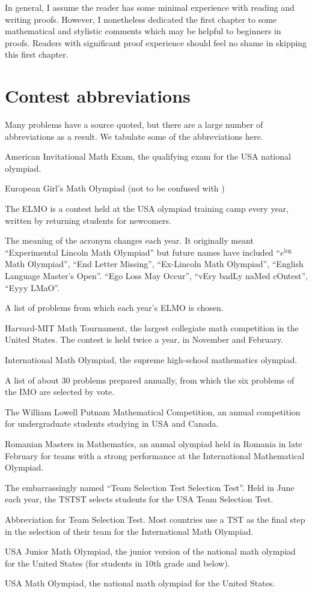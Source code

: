 In general, I assume the reader has some minimal
experience with reading and writing proofs.
However, I nonetheless dedicated the first chapter
to some mathematical and stylistic comments
which may be helpful to beginners in proofs.
Readers with significant proof experience should
feel no shame in skipping this first chapter.

\section*{Contest abbreviations}
Many problems have a source quoted,
but there are a large number of abbreviations as a result.
We tabulate some of the abbreviations here.

\begin{description}
	\ii[AIME] American Invitational Math Exam,
	the qualifying exam for the USA national olympiad.

	\ii[EGMO] European Girl's Math Olympiad
	(not to be confused with \cite{ref:EGMO})

	\ii[ELMO] The ELMO is a contest held at the USA olympiad
	training camp every year,
	written by returning students for newcomers.

	The meaning of the acronym changes each year.
	It originally meant ``Experimental Lincoln Math Olympiad''
	but future names have included ``$e^{\log}$ Math Olympiad'',
	``End Letter Missing'', ``Ex-Lincoln Math Olympiad'',
	``English Language Master's Open''.  ``Ego Loss May Occur'',
	``vEry badLy naMed cOntest'', ``Eyyy LMaO''.

	 A list of problems
	from which each year's ELMO is chosen.

	\ii[HMMT] Harvard-MIT Math Tournament,
	the largest collegiate math competition in the United States.
	The contest is held twice a year, in November and February.

	\ii[IMO] International Math Olympiad, the supreme
	high-school mathematics olympiad.

	 A list of about $30$
	problems prepared annually,
	from which the six problems of the IMO are selected by vote.

	\ii[Putnam] The William Lowell Putnam Mathematical Competition,
	an annual competition for undergraduate students studying in USA and Canada.

	\ii[RMM] Romanian Masters in Mathematics,
	an annual olympiad held in Romania in late February
	for teams with a strong performance
	at the International Mathematical Olympiad.

	\ii[TSTST] The embarrassingly named
	``Team Selection Test Selection Test''.
	Held in June each year, the TSTST
	selects students for the USA Team Selection Test.

	\ii[TST] Abbreviation for Team Selection Test.
	Most countries use a TST as the final step
	in the selection of their team for the International Math Olympiad.

	\ii[USAJMO] USA Junior Math Olympiad,
	the junior version of the national math olympiad for the United States
	(for students in 10th grade and below).

	\ii[USAMO] USA Math Olympiad,
	the national math olympiad for the United States.
\end{description}
